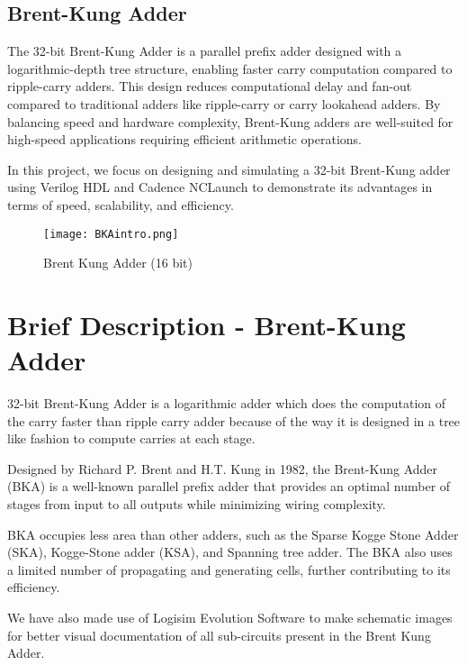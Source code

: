 \documentclass{IEEEtran}
\begin{document}
\subsection{Brent-Kung Adder}
The 32-bit Brent-Kung Adder is a parallel prefix adder designed with a logarithmic-depth tree structure, enabling faster carry computation compared to ripple-carry adders. This design reduces computational delay and fan-out compared to traditional adders like ripple-carry or carry lookahead adders. By balancing speed and hardware complexity, Brent-Kung adders are well-suited for high-speed applications requiring efficient arithmetic operations.

 In this project, we focus on designing and simulating a 32-bit Brent-Kung adder using Verilog HDL and Cadence NCLaunch to demonstrate its advantages in terms of speed, scalability, and efficiency.
\begin{figure}[H]
    \centering
    \texttt{[image: BKAintro.png]}
    \caption{Brent Kung Adder (16 bit)}
    \label{fig:enter-label}
\end{figure}

\section{Brief Description - Brent-Kung Adder}
32-bit Brent-Kung Adder is a logarithmic adder which does the computation of the carry faster than ripple carry adder because of the way it is designed in a tree like fashion to compute carries at each stage. 

Designed by Richard P. Brent and H.T. Kung in 1982, the Brent-Kung Adder (BKA) is a well-known parallel prefix adder that provides an optimal number of stages from input to all outputs while minimizing wiring complexity. 

BKA occupies less area than other adders, such as the Sparse Kogge Stone Adder (SKA), Kogge-Stone adder (KSA), and Spanning tree adder. The BKA also uses a limited number of propagating and generating cells, further contributing to its efficiency.

We have also made use of Logisim Evolution Software to make schematic images for better visual documentation of all sub-circuits present in the Brent Kung Adder.
\end{document}
